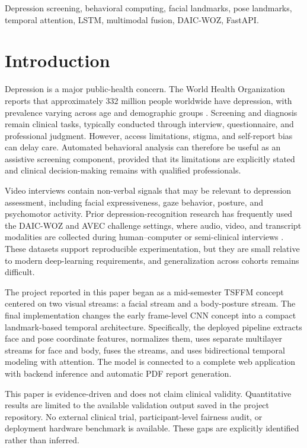 \documentclass[conference]{IEEEtran}
\begin{document}
\begin{IEEEkeywords}
Depression screening, behavioral computing, facial landmarks, pose landmarks, temporal attention, LSTM, multimodal fusion, DAIC-WOZ, FastAPI.
\end{IEEEkeywords}

\section{Introduction}
Depression is a major public-health concern. The World Health Organization reports that approximately 332 million people worldwide have depression, with prevalence varying across age and demographic groups \cite{who_depression}. Screening and diagnosis remain clinical tasks, typically conducted through interview, questionnaire, and professional judgment. However, access limitations, stigma, and self-report bias can delay care. Automated behavioral analysis can therefore be useful as an assistive screening component, provided that its limitations are explicitly stated and clinical decision-making remains with qualified professionals.

Video interviews contain non-verbal signals that may be relevant to depression assessment, including facial expressiveness, gaze behavior, posture, and psychomotor activity. Prior depression-recognition research has frequently used the DAIC-WOZ and AVEC challenge settings, where audio, video, and transcript modalities are collected during human--computer or semi-clinical interviews \cite{gratch_daic, ringeval_avec2017, zhang_multimodal}. These datasets support reproducible experimentation, but they are small relative to modern deep-learning requirements, and generalization across cohorts remains difficult.

The project reported in this paper began as a mid-semester TSFFM concept centered on two visual streams: a facial stream and a body-posture stream. The final implementation changes the early frame-level CNN concept into a compact landmark-based temporal architecture. Specifically, the deployed pipeline extracts face and pose coordinate features, normalizes them, uses separate multilayer streams for face and body, fuses the streams, and uses bidirectional temporal modeling with attention. The model is connected to a complete web application with backend inference and automatic PDF report generation.

This paper is evidence-driven and does not claim clinical validity. Quantitative results are limited to the available validation output saved in the project repository. No external clinical trial, participant-level fairness audit, or deployment hardware benchmark is available. These gaps are explicitly identified rather than inferred.
\end{document}
